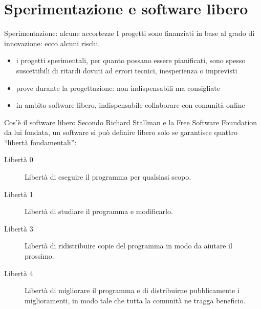 \documentclass{beamer}
\begin{document}
	\section{Sperimentazione e software libero}
		
		\begin{frame}{Sperimentazione: alcune accortezze}
			I progetti sono finanziati in base al grado di innovazione: ecco alcuni rischi.
			\begin{itemize}
				\item i progetti sperimentali, per quanto possano essere pianificati, sono spesso suscettibili di ritardi dovuti ad errori tecnici, inesperienza o imprevisti
				\item prove durante la progettazione: non indispensabili ma consigliate
				\item in ambito software libero, indispensabile collaborare con comunità online
			\end{itemize}
		\end{frame}

		\begin{frame}{Cos'è il software libero}
			Secondo Richard Stallman e la Free Software Foundation da lui fondata, un software si può definire libero solo se garantisce quattro ``libertà fondamentali'':
			\begin{description}
				\item[Libertà 0] Libertà di eseguire il programma per qualsiasi scopo.
				\item[Libertà 1] Libertà di studiare il programma e modificarlo.
				\item[Libertà 3] Libertà di ridistribuire copie del programma in modo da aiutare il prossimo.
				\item[Libertà 4] Libertà di migliorare il programma e di distribuirne pubblicamente i miglioramenti, in modo tale che tutta la comunità ne tragga beneficio.
			\end{description}
		\end{frame}
\end{document}
